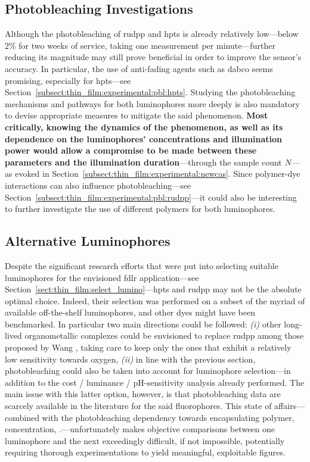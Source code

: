 \subsection{Photobleaching Investigations}\label{sect:conclusion:photobleaching}

Although the photobleaching of \gls{rudpp} and \gls{hpts} is already relatively low---below 2\% for two weeks of service, taking one measurement per minute---further reducing its magnitude may still prove beneficial in order to improve the sensor's accuracy. In particular, the use of anti-fading agents such as \gls{dabco} seems promising, especially for \gls{hpts}---see Section~\ref{subsect:thin_film:experimental:pbl:hpts}. Studying the photobleaching mechanisms and pathways for both luminophores more deeply is also mandatory to devise appropriate measures to mitigate the said phenomenon. \textbf{Most critically, knowing the dynamics of the phenomenon, as well as its dependence on the luminophores' concentrations and illumination power would allow a compromise to be made between these parameters and the illumination duration}---through the sample count $N$---as evoked in Section~\ref{subsect:thin_film:experimental:newcas}. Since polymer-dye interactions can also influence photobleaching---see Section~\ref{subsect:thin_film:experimental:pbl:rudpp}---it could also be interesting to further investigate the use of different polymers for both luminophores.

\subsection{Alternative Luminophores}

Despite the significant research efforts that were put into selecting suitable luminophores for the envisioned \gls{fdlr} application---see Section~\ref{sect:thin_film:select_lumino}---\gls{hpts} and \gls{rudpp} may not be the absolute optimal choice. Indeed, their selection was performed on a subset of the myriad of available off-the-shelf luminophores, and other dyes might have been benchmarked. In particular two main directions could be followed: \textit{(i)} other long-lived organometallic complexes could be envisioned to replace \gls{rudpp} among those proposed by Wang \etal{}\cite[Sect.~6.2]{wang2014wolfbeis}, taking care to keep only the ones that exhibit a relatively low sensitivity towards oxygen, \textit{(ii)} in line with the previous section, photobleaching could also be taken into account for luminophore selection---in addition to the cost / luminance / pH-sensitivity analysis already performed. The main issue with this latter option, however, is that photobleaching data are scarcely available in the literature for the said fluorophores. This state of affairs---combined with the photobleaching dependency towards encapsulating polymer, concentration, \etc.---unfortunately makes objective comparisons between one luminophore and the next exceedingly difficult, if not impossible, potentially requiring thorough experimentations to yield meaningful, exploitable figures.

